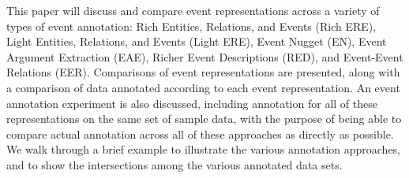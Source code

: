 This paper will discuss and compare event representations across a variety of types of event annotation: Rich Entities, Relations, and Events (Rich ERE), Light Entities, Relations, and Events (Light ERE), Event Nugget (EN), Event Argument Extraction (EAE), Richer Event Descriptions (RED), and Event-Event Relations (EER).  Comparisons of event representations are presented, along with a comparison of data annotated according to each event representation.  An event annotation experiment is also discussed, including annotation for all of these representations on the same set of sample data, with the purpose of being able to compare actual annotation across all of these approaches as directly as possible. We walk through a brief example to illustrate the various annotation approaches, and to show the intersections among the various annotated data sets.
